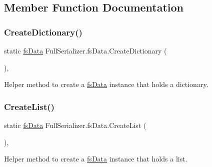 \subsection{Member Function Documentation}
\mbox{\label{class_full_serializer_1_1fs_data_a736d3ed458af91620f8eb47447f15233}} 
\subsubsection{\texorpdfstring{Create\+Dictionary()}{CreateDictionary()}}
{\footnotesize\ttfamily static \hyperlink{class_full_serializer_1_1fs_data}{fs\+Data} Full\+Serializer.\+fs\+Data.\+Create\+Dictionary (\begin{DoxyParamCaption}{ }\end{DoxyParamCaption})\hspace{0.3cm}{\ttfamily [inline]}, {\ttfamily [static]}}



Helper method to create a \hyperlink{class_full_serializer_1_1fs_data}{fs\+Data} instance that holds a dictionary. 

\mbox{\label{class_full_serializer_1_1fs_data_ac7c719ebad471a4a00b812097d436a73}} 
\subsubsection{\texorpdfstring{Create\+List()}{CreateList()}\hspace{0.1cm}{\footnotesize\ttfamily [1/2]}}
{\footnotesize\ttfamily static \hyperlink{class_full_serializer_1_1fs_data}{fs\+Data} Full\+Serializer.\+fs\+Data.\+Create\+List (\begin{DoxyParamCaption}{ }\end{DoxyParamCaption})\hspace{0.3cm}{\ttfamily [inline]}, {\ttfamily [static]}}



Helper method to create a \hyperlink{class_full_serializer_1_1fs_data}{fs\+Data} instance that holds a list. 

